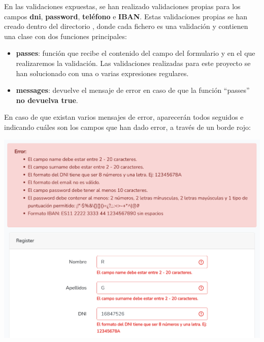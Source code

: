 \documentclass{\ClassPath/viu-tfm-template}
\begin{document}

En las validaciones expuestas, se han realizado validaciones propias para los campos \textbf{dni}, \textbf{password}, \textbf{teléfono} e \textbf{IBAN}. Estas validaciones propias se han creado dentro del directorio , donde cada fichero es una validación y contienen una clase con dos funciones principales:

\begin{itemize}
    \item \textbf{passes}: función que recibe el contenido del campo del formulario y en el que realizaremos la validación. Las validaciones realizadas para este proyecto se han solucionado con una o varias expresiones regulares.

    \item \textbf{messages}: devuelve el mensaje de error en caso de que la función “passes” \textbf{no devuelva true}.
\end{itemize}

En caso de que existan varios mensajes de error, aparecerán todos seguidos e indicando cuáles son los campos que han dado error, a través de un borde rojo:

\begin{center}
    \includegraphics[frame,width=0.8\linewidth]{img/errores.png}
\end{center}
\end{document}
